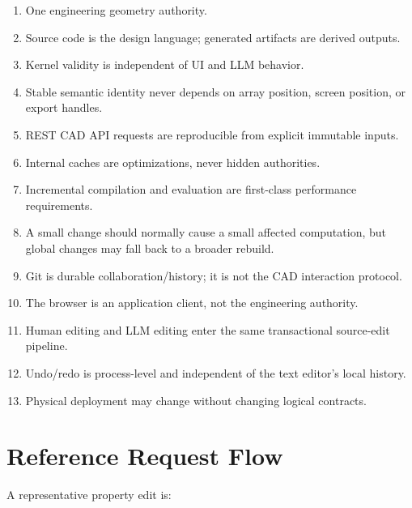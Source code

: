 \documentclass[11pt,a4paper]{article}
\begin{document}
\begin{enumerate}
    \item One engineering geometry authority.
    \item Source code is the design language; generated artifacts are derived outputs.
    \item Kernel validity is independent of UI and LLM behavior.
    \item Stable semantic identity never depends on array position, screen position, or export handles.
    \item REST CAD API requests are reproducible from explicit immutable inputs.
    \item Internal caches are optimizations, never hidden authorities.
    \item Incremental compilation and evaluation are first-class performance requirements.
    \item A small change should normally cause a small affected computation, but global changes may fall back to a broader rebuild.
    \item Git is durable collaboration/history; it is not the CAD interaction protocol.
    \item The browser is an application client, not the engineering authority.
    \item Human editing and LLM editing enter the same transactional source-edit pipeline.
    \item Undo/redo is process-level and independent of the text editor's local history.
    \item Physical deployment may change without changing logical contracts.
\end{enumerate}

\section{Reference Request Flow}

A representative property edit is:
\end{document}

